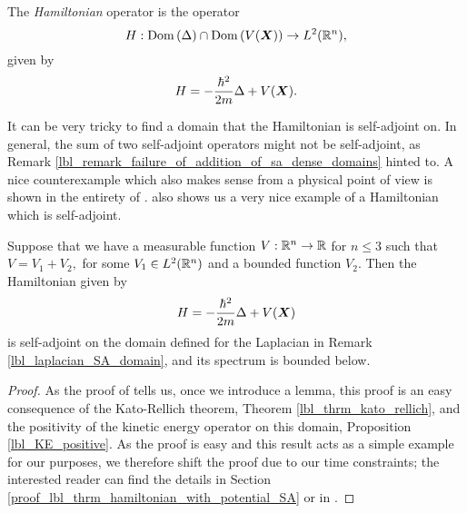 \begin{definition}
  The {\emph{Hamiltonian}} operator is the operator \[H: \operatorname{Dom}\left(\Delta\right) \cap \operatorname{Dom}\left(V(\boldsymbol{X})\right) \to L^2(\mathbb{R}^n),\] given by \[H = -\frac{\hbar^2}{2m}\Delta + V(\boldsymbol{X}).\]
\end{definition}

It can be very tricky to find a domain that the Hamiltonian is self-adjoint on. In general, the sum of two self-adjoint operators might not be self-adjoint, as Remark \eqref{lbl_remark_failure_of_addition_of_sa_dense_domains} hinted to. A nice counterexample which also makes sense from a physical point of view is shown in the entirety of {\cite[Chapter 9.10]{Hall2013}}. {\cite[Theorem 9.38]{Hall2013}} also shows us a very nice example of a Hamiltonian which is self-adjoint.

\begin{theorem}{\cite[Theorem 9.38]{Hall2013}}\label{lbl_thrm_hamiltonian_with_potential_SA}
  Suppose that we have a measurable function $V: \mathbb{R}^n \to \mathbb{R}$ for $n \leq 3$ such that \(
    V = V_1 + V_2,
  \) for some $V_1 \in L^2(\mathbb{R}^n)$ and a bounded function $V_2$. Then the Hamiltonian given by
  \begin{equation*}
    H = -\frac{\hbar^2}{2m}\Delta + V(\boldsymbol{X})
  \end{equation*}
  is self-adjoint on the domain defined for the Laplacian in Remark \eqref{lbl_laplacian_SA_domain}, and its spectrum is bounded below.
\end{theorem}
\begin{proof}
  As the proof of {\cite[Theorem 9.38]{Hall2013}} tells us, once we introduce a lemma, this proof is an easy consequence of the Kato-Rellich theorem, Theorem \eqref{lbl_thrm_kato_rellich}, and the positivity of the kinetic energy operator on this domain, Proposition \eqref{lbl_KE_positive}. As the proof is easy and this result acts as a simple example for our purposes, we therefore shift the proof due to our time constraints; the interested reader can find the details in Section \eqref{proof_lbl_thrm_hamiltonian_with_potential_SA} or in {\cite[Theorem 9.38]{Hall2013}}.
\end{proof}
